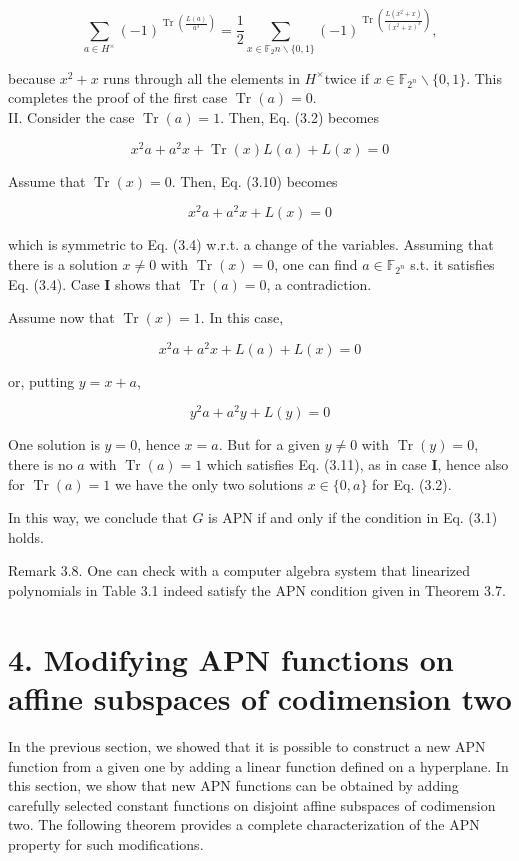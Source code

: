 \documentclass[10pt]{article}
\begin{document}
$$
\sum_{a \in H^{\times}}(-1)^{\operatorname{Tr}\left(\frac{L(a)}{a^{3}}\right)}=\frac{1}{2} \sum_{x \in \mathbb{F}_{2} n \backslash\{0,1\}}(-1)^{\operatorname{Tr}\left(\frac{L\left(x^{2}+x\right)}{\left(x^{2}+x\right)^{3}}\right)},
$$

because $x^{2}+x$ runs through all the elements in $H^{\times}$twice if $x \in \mathbb{F}_{2^{n}} \backslash\{0,1\}$. This completes the proof of the first case $\operatorname{Tr}(a)=0$.\\
II. Consider the case $\operatorname{Tr}(a)=1$. Then, Eq. (3.2) becomes


\begin{equation*}
x^{2} a+a^{2} x+\operatorname{Tr}(x) L(a)+L(x)=0 \tag{3.10}
\end{equation*}


Assume that $\operatorname{Tr}(x)=0$. Then, Eq. (3.10) becomes

$$
x^{2} a+a^{2} x+L(x)=0
$$

which is symmetric to Eq. (3.4) w.r.t. a change of the variables. Assuming that there is a solution $x \neq 0$ with $\operatorname{Tr}(x)=0$, one can find $a \in \mathbb{F}_{2^{n}}$ s.t. it satisfies Eq. (3.4). Case $\mathbf{I}$ shows that $\operatorname{Tr}(a)=0$, a contradiction.

Assume now that $\operatorname{Tr}(x)=1$. In this case,

$$
x^{2} a+a^{2} x+L(a)+L(x)=0
$$

or, putting $y=x+a$,


\begin{equation*}
y^{2} a+a^{2} y+L(y)=0 \tag{3.11}
\end{equation*}


One solution is $y=0$, hence $x=a$. But for a given $y \neq 0$ with $\operatorname{Tr}(y)=0$, there is no $a$ with $\operatorname{Tr}(a)=1$ which satisfies Eq. (3.11), as in case $\mathbf{I}$, hence also for $\operatorname{Tr}(a)=1$ we have the only two solutions $x \in\{0, a\}$ for Eq. (3.2).

In this way, we conclude that $G$ is APN if and only if the condition in Eq. (3.1) holds.

Remark 3.8. One can check with a computer algebra system that linearized polynomials in Table 3.1 indeed satisfy the APN condition given in Theorem 3.7.

\section*{4. Modifying APN functions on affine subspaces of codimension two}
In the previous section, we showed that it is possible to construct a new APN function from a given one by adding a linear function defined on a hyperplane. In this section, we show that new APN functions can be obtained by adding carefully selected constant functions on disjoint affine subspaces of codimension two. The following theorem provides a complete characterization of the APN property for such modifications.
\end{document}
